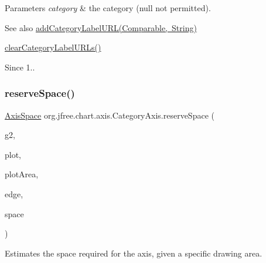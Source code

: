 \begin{DoxyParams}{Parameters}
{\em category} & the category ({\ttfamily null} not permitted).\\
\hline
\end{DoxyParams}
\begin{DoxySeeAlso}{See also}
\mbox{\hyperlink{classorg_1_1jfree_1_1chart_1_1axis_1_1_category_axis_a305f59a6b2cd0512e01e4b08de21d36b}{add\+Category\+Label\+U\+R\+L(\+Comparable, String)}} 

\mbox{\hyperlink{classorg_1_1jfree_1_1chart_1_1axis_1_1_category_axis_a6ee7ce39072375794c23ac3d1221d2da}{clear\+Category\+Label\+U\+R\+Ls()}}
\end{DoxySeeAlso}
\begin{DoxySince}{Since}
1.. 
\end{DoxySince}
\mbox{\label{classorg_1_1jfree_1_1chart_1_1axis_1_1_category_axis_a217be770d9046a04614a52cc73da8d75}} 
\subsubsection{\texorpdfstring{reserve\+Space()}{reserveSpace()}}
{\footnotesize\ttfamily \mbox{\hyperlink{classorg_1_1jfree_1_1chart_1_1axis_1_1_axis_space}{Axis\+Space}} org.\+jfree.\+chart.\+axis.\+Category\+Axis.\+reserve\+Space (\begin{DoxyParamCaption}\item[{Graphics2D}]{g2,  }\item[{\mbox{\hyperlink{classorg_1_1jfree_1_1chart_1_1plot_1_1_plot}{Plot}}}]{plot,  }\item[{Rectangle2D}]{plot\+Area,  }\item[{Rectangle\+Edge}]{edge,  }\item[{\mbox{\hyperlink{classorg_1_1jfree_1_1chart_1_1axis_1_1_axis_space}{Axis\+Space}}}]{space }\end{DoxyParamCaption})}

Estimates the space required for the axis, given a specific drawing area.


